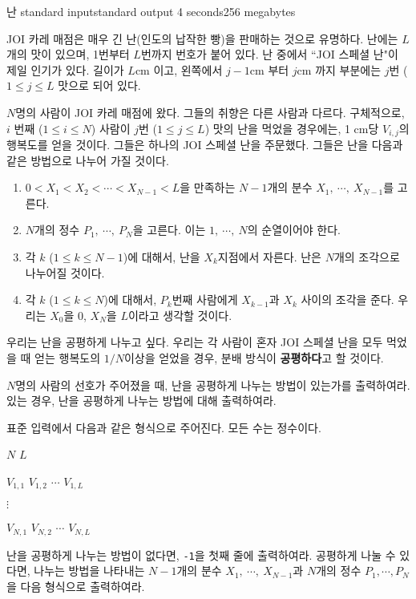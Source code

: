 \begin{problem}{난}
	{standard input}{standard output}
	{4 seconds}{256 megabytes}{}
	
	JOI 카레 매점은 매우 긴 난(인도의 납작한 빵)을 판매하는 것으로 유명하다. 난에는 $L$개의 맛이 있으며, 1번부터 $L$번까지 번호가 붙어 있다. 난 중에서 ``JOI 스페셜 난"이 제일 인기가 있다. 길이가 $L$cm 이고, 왼쪽에서 $j-1$cm 부터 $j$cm 까지 부분에는 $j$번 ($1\le j \le L$ 맛으로 되어 있다.
	
	$N$명의 사람이 JOI 카레 매점에 왔다. 그들의 취향은 다른 사람과 다르다. 구체적으로, $i$ 번째 ($1 \le i \le N$) 사람이 $j$번 ($1 \le j \le L$) 맛의 난을 먹었을 경우에는, 1 cm당 $V_{i, j}$의 행복도를 얻을 것이다.
	그들은 하나의 JOI 스페셜 난을 주문했다. 그들은 난을 다음과 같은 방법으로 나누어 가질 것이다.
	
	\begin{enumerate}
		\item $0 < X_1 < X_2 < \cdots < X_{N-1} < L$을 만족하는 $N-1$개의 분수 $X_1,\ \cdots,\ X_{N-1}$를 고른다.
		\item $N$개의 정수 $P_1,\ \cdots, \ P_N$을 고른다. 이는 $1, \ \cdots, \ N$의 순열이어야 한다.
		\item 각 $k$ ($1 \le k \le N-1$)에 대해서, 난을 $X_k$지점에서 자른다. 난은 $N$개의 조각으로 나누어질 것이다.
		\item 각 $k$ ($1 \le k \le N$)에 대해서, $P_k$번째 사람에게 $X_{k-1}$과 $X_k$ 사이의 조각을 준다. 우리는 $X_0$을 0, $X_N$을 $L$이라고 생각할 것이다.
	\end{enumerate}

	우리는 난을 공평하게 나누고 싶다. 우리는 각 사람이 혼자 JOI 스페셜 난을 모두 먹었을 때 얻는 행복도의 $1/N$이상을 얻었을 경우, 분배 방식이 \textbf{공평하다}고 할 것이다.
	
	$N$명의 사람의 선호가 주어졌을 때, 난을 공평하게 나누는 방법이 있는가를 출력하여라. 있는 경우, 난을 공평하게 나누는 방법에 대해 출력하여라.
	
	\InputFile
	
	표준 입력에서 다음과 같은 형식으로 주어진다. 모든 수는 정수이다.
	
	$N$ $L$
	
	$V_{1,1}$ $V_{1, 2}$ $\cdots$ $V_{1, L}$
	
	$\vdots$
	
	$V_{N,1}$ $V_{N, 2}$ $\cdots$ $V_{N, L}$
	
	\OutputFile
	
	난을 공평하게 나누는 방법이 없다면, \texttt{-1}을 첫째 줄에 출력하여라. 공평하게 나눌 수 있다면, 나누는 방법을 나타내는 $N-1$개의 분수 $X_1,\ \cdots,\ X_{N-1}$과 $N$개의 정수 $P_1, \cdots, P_N$을 다음 형식으로 출력하여라.
	

\end{problem}
